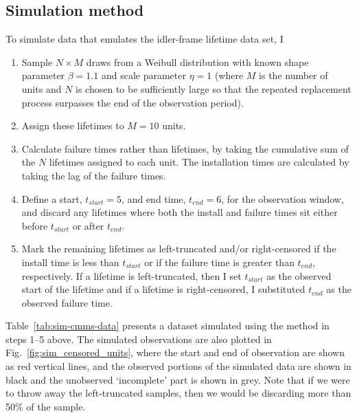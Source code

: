 \subsection{Simulation method} \label{subsec:sim-method-weibull}

To simulate data that emulates the idler-frame lifetime data set, I
\begin{enumerate}
    \item Sample $N \times M$ draws from a Weibull distribution with known shape parameter $\beta = 1.1$ and scale parameter $\eta = 1$ (where $M$ is the number of units and $N$ is chosen to be sufficiently large so that the repeated replacement process surpasses the end of the observation period).
    \item Assign these lifetimes to $M = 10$ units.
    \item Calculate failure times rather than lifetimes, by taking the cumulative sum of the $N$ lifetimes assigned to each unit. The installation times are calculated by taking the lag of the failure times.
    \item Define a start, $t_{start} = 5$, and end time, $t_{end} = 6$, for the observation window, and discard any lifetimes where both the install and failure times sit either before $t_{start}$ or after $t_{end}$.
    \item Mark the remaining lifetimes as left-truncated and/or right-censored if the install time is less than $t_{start}$ or if the failure time is greater than $t_{end}$, respectively. If a lifetime is left-truncated, then I set $t_{start}$ as the observed start of the lifetime and if a lifetime is right-censored, I substituted $t_{end}$ as the observed failure time.
\end{enumerate}
Table~\ref{tab:sim-cmms-data} presents a dataset simulated using the method in steps 1--5 above. The simulated observations are also plotted in Fig.~\ref{fig:sim_censored_units}, where the start and end of observation are shown as red vertical lines, and the observed portions of the simulated data are shown in black and the unobserved `incomplete' part is shown in grey. Note that if we were to throw away the left-truncated samples, then we would be discarding more than 50\% of the sample.

